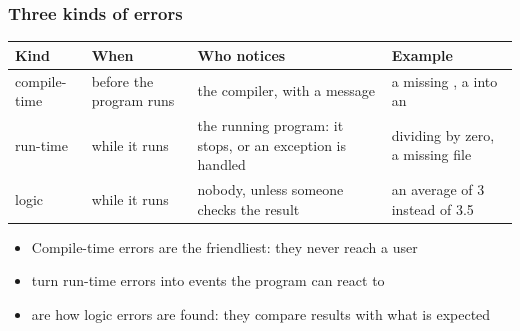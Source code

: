 \documentclass[aspectratio=169,10pt,compress]{beamer}
\begin{document}
\begin{frame}[t,fragile] \frametitle{Three kinds of errors}


\begin{table}
		\small
		\begin{tabular}{@{}L{0.15\textwidth}L{0.23\textwidth}L{0.27\textwidth}L{0.26\textwidth}@{}}
			\toprule
			\textbf{Kind} & \textbf{When} & \textbf{Who notices} & \textbf{Example} \\
			\midrule
			compile-time & before the program runs & the compiler, with a message & a missing \hCode{;}, a  into an  \\
			run-time     & while it runs           & the running program: it stops, or an exception is handled & dividing by zero, a missing file \\
			logic        & while it runs           & nobody, unless someone checks the result & an average of 3 instead of 3.5 \\
			\bottomrule
		\end{tabular}
\end{table}%


	\vspace{0.5em}
	\begin{itemize}\small
		\item Compile-time errors are the friendliest: they never reach a user
		\item {} turn run-time errors into events the program can react to
		\item {} are how logic errors are found: they compare results with what is expected
	\end{itemize}
\end{frame}
\end{document}
